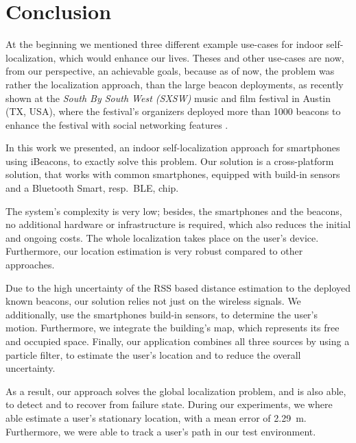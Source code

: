 \chapter{Conclusion} \label{chap:conclusion}
At the beginning we mentioned three different example use-cases for indoor self-localization, which would enhance our lives. Theses and other use-cases are now, from our perspective, an achievable goals, because as of now, the problem was rather the localization approach, than the large beacon deployments, as recently shown at the \emph{South By South West (SXSW)} music and film festival in Austin (TX, USA), where the festival's organizers deployed more than 1000 beacons to enhance the festival with social networking features \citep{mashable}.

In this work we presented, an indoor self-localization approach for smartphones using iBeacons, to exactly solve this problem. Our solution is a cross-platform solution, that works with common smartphones, equipped with build-in sensors and a Bluetooth Smart, resp.\ \acl{BLE}, chip.

The system's complexity is very low; besides, the smartphones and the beacons, no additional hardware or infrastructure is required, which also reduces the initial and ongoing costs. The whole localization takes place on the user's device. Furthermore, our location estimation is very robust compared to other approaches.

Due to the high uncertainty of the \acs{RSS} based distance estimation to the deployed known beacons, our solution relies not just on the wireless signals. We additionally, use the smartphones build-in sensors, to determine the user's motion. Furthermore, we integrate the building's map, which represents its free and occupied space. Finally, our application combines all three sources by using a particle filter, to estimate the user's location and to reduce the overall uncertainty.

As a result, our approach solves the global localization problem, and is also able, to detect and to recover from failure state. During our experiments, we where able estimate a user's stationary location, with a mean error of 2.29~m. Furthermore, we were able to track a user's path in our test environment. 



